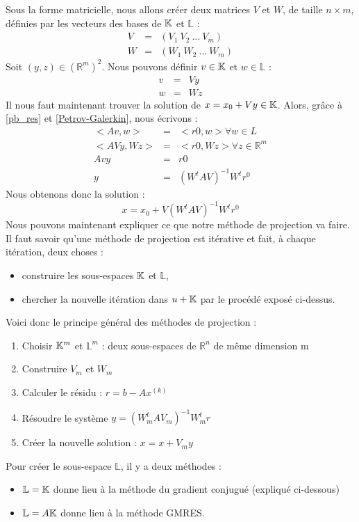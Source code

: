 Sous la forme matricielle, nous allons créer deux matrices $V$ et $W$, de taille $n \times m$,  définies par les vecteurs des bases de $\mathbb{K}$ et $\mathbb{L}$ : 
\begin{eqnarray}
V &=& (V_1 \ V_2 \ ... \ V_m ) \\
W &=& (W_1 \ W_2 \ ... \ W_m )
\end{eqnarray}
Soit $(y, z) \in (\mathbb{R}^m)^2$. Nous pouvons définir $v \in \mathbb{K}$ et $w \in \mathbb{L}$ :
\begin{eqnarray}
v &=& Vy\\
w &=& Wz
\end{eqnarray}
Il nous faut maintenant trouver la solution de $ x = x_0 + Vy \in \mathbb{K}$. Alors, grâce à \ref{pb_res} et \ref{Petrov-Galerkin}, nous écrivons : 
\begin{eqnarray}
<Av, w> &=& <r0, w> \forall w \in L\\
<AVy, Wz> &=& <r0, Wz> \forall z \in \mathbb{R}^m \\
Avy &=& r0 \\
y &=& (W^t A V)^{-1} W^tr^0
\end{eqnarray}
Nous obtenons donc la solution : 
\begin{equation}
x = x_0 + V (W^t A V)^{-1} W^tr^0
\end{equation}
Nous pouvons maintenant expliquer ce que notre méthode de projection va faire. Il faut savoir qu'une méthode de projection est itérative et fait, à chaque itération, deux choses  :
\begin{itemize}
	\item construire les sous-espaces $\mathbb{K}$ et $\mathbb{L}$,
	\item chercher la nouvelle itération dans $u + \mathbb{K}$ par le procédé exposé ci-dessus.
\end{itemize}
Voici donc le principe général des méthodes de projection : 
\begin{enumerate}
	\item Choisir $\mathbb{K}^m$ et $\mathbb{L}^m$ : deux sous-espaces de $\mathbb{R}^n$ de même dimension m
	\item Construire $V_m$ et $W_m$
	\item Calculer le résidu : $r = b - Ax^{(k)}$
	\item Résoudre le système $y = (W^t_m A V_m)^{-1} W^t_mr$
	\item Créer la nouvelle solution : $x = x + V_m y$
\end{enumerate}
Pour créer le sous-espace $\mathbb{L}$, il y a deux méthodes : 
\begin{itemize}
	\item $\mathbb{L} = \mathbb{K}$ donne lieu à la méthode du gradient conjugué (expliqué ci-dessous)
	\item $\mathbb{L} = A\mathbb{K}$ donne lieu à la méthode GMRES.
\end{itemize}
